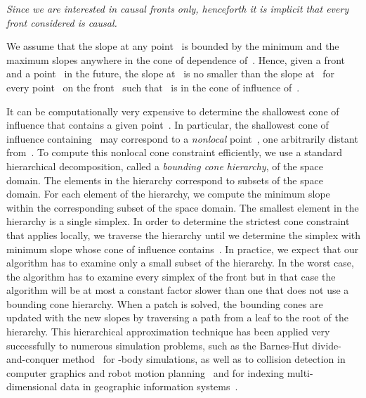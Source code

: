\documentclass[twocolumn]{article}
\begin{document}
\emph{Since we are interested in causal fronts only, henceforth it is
  implicit that every front considered is causal.}

We assume that the slope at any point~ is bounded by the minimum
and the maximum slopes anywhere in the cone of dependence of~.
Hence, given a front~ and a point~ in the future, the slope
at~ is no smaller than the slope at~ for every point~
on the front~ such that~ is in the cone of influence of~.

It can be computationally very expensive to determine the shallowest
cone of influence that contains a given point~.  In particular,
the shallowest cone of influence containing~ may correspond to a
\emph{nonlocal} point~, one arbitrarily distant from~.  To
compute this nonlocal cone constraint efficiently, we use a standard
hierarchical decomposition, called a \emph{bounding cone hierarchy},
of the space domain.  The elements in the hierarchy correspond to
subsets of the space domain.  For each element of the hierarchy, we
compute the minimum slope within the corresponding subset of the space
domain.  The smallest element in the hierarchy is a single simplex.
In order to determine the strictest cone constraint that applies
locally, we traverse the hierarchy until we determine the simplex with
minimum slope whose cone of influence contains~.  In practice, we
expect that our algorithm has to examine only a small subset of the
hierarchy.  In the worst case, the algorithm has to examine every
simplex of the front but in that case the algorithm will be at most a
constant factor slower than one that does not use a bounding cone
hierarchy.  When a patch is solved, the bounding cones are updated
with the new slopes by traversing a path from a leaf to the root of
the hierarchy.  This hierarchical approximation technique has been
applied very successfully to numerous simulation problems, such as the
Barnes-Hut divide-and-conquer method~\cite{barnes-hut86nbody} for
-body simulations, as well as to collision detection in computer
graphics and robot motion planning~\cite{lin96collision} and for
indexing multi-dimensional data in geographic information
systems~\cite{guttman84rtrees}.

\iffalse
In Section~\ref{sec:1d}, we describe the problem and our solution for
the case of one-dimensional space domains.  Several aspects of the
complexity of the problem are evident even in the 1DTime case.
In Section~\ref{sec:2d}, we describe our algorithm for planar space
domains.  We describe sufficient conditions such that the front at
every step is guaranteed to make progress.  Finally, we conclude by
comparing our results to previous work on the uniform wavespeed case.
\fi
\end{document}
